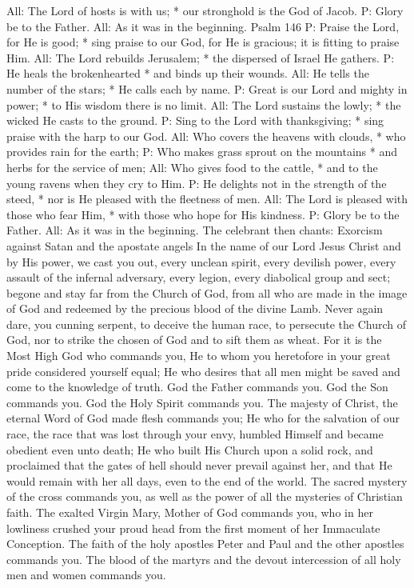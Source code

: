 All: The Lord of hosts is with us; * our stronghold is the God of Jacob.
P: Glory be to the Father.
All: As it was in the beginning.
Psalm 146
P: Praise the Lord, for He is good; * sing praise to our God, for He is gracious; it is fitting to praise Him.
All: The Lord rebuilds Jerusalem; * the dispersed of Israel He gathers.
P: He heals the brokenhearted * and binds up their wounds.
All: He tells the number of the stars; * He calls each by name.
P: Great is our Lord and mighty in power; * to His wisdom there is no limit.
All: The Lord sustains the lowly; * the wicked He casts to the ground.
P: Sing to the Lord with thanksgiving; * sing praise with the harp to our God.
All: Who covers the heavens with clouds, * who provides rain for the earth;
P: Who makes grass sprout on the mountains * and herbs for the service of men;
All: Who gives food to the cattle, * and to the young ravens when they cry to Him.
P: He delights not in the strength of the steed, * nor is He pleased with the fleetness of men.
All: The Lord is pleased with those who fear Him, * with those who hope for His kindness.
P: Glory be to the Father.
All: As it was in the beginning.
The celebrant then chants:
Exorcism against Satan and the apostate angels
In the name of our Lord Jesus Christ and by His power, we cast you out, every unclean spirit, every devilish power, every assault of the infernal adversary, every legion, every diabolical group and sect; begone and stay far from the Church of God, from all who are made in the image of God and redeemed by the precious blood of the divine Lamb. Never again dare, you cunning serpent, to deceive the human race, to persecute the Church of God, nor to strike the chosen of God and to sift them as wheat. For it is the Most High God who commands you, He to whom you heretofore in your great pride considered yourself equal; He who desires that all men might be saved and come to the knowledge of truth. God the Father commands you. God the Son commands you. God the Holy Spirit commands you. The majesty of Christ, the eternal Word of God made flesh commands you; He who for the salvation of our race, the race that was lost through your envy, humbled Himself and became obedient even unto death; He who built His Church upon a solid rock, and proclaimed that the gates of hell should never prevail against her, and that He would remain with her all days, even to the end of the world. The sacred mystery of the cross commands you, as well as the power of all the mysteries of Christian faith. The exalted Virgin Mary, Mother of God commands you, who in her lowliness crushed your proud head from the first moment of her Immaculate Conception. The faith of the holy apostles Peter and Paul and the other apostles commands you. The blood of the martyrs and the devout intercession of all holy men and women commands you.
